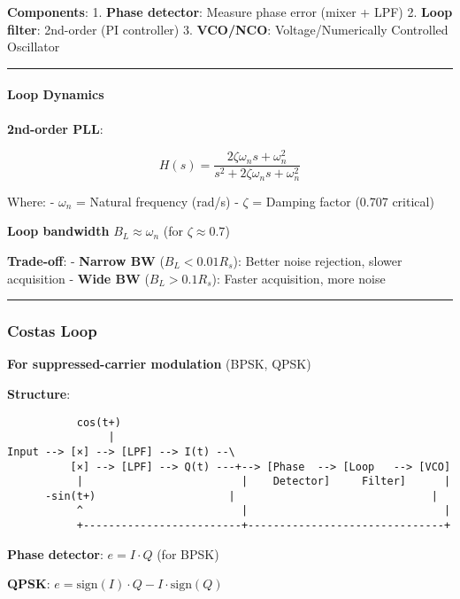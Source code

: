 \textbf{Components}: 1. \textbf{Phase detector}: Measure phase error
(mixer + LPF) 2. \textbf{Loop filter}: 2nd-order (PI controller) 3.
\textbf{VCO/NCO}: Voltage/Numerically Controlled Oscillator

\begin{center}\rule{0.5\linewidth}{0.5pt}\end{center}

\paragraph{Loop Dynamics}\label{loop-dynamics}

\textbf{2nd-order PLL}:

\[
H(s) = \frac{2\zeta\omega_n s + \omega_n^2}{s^2 + 2\zeta\omega_n s + \omega_n^2}
\]

Where: - \(\omega_n\) = Natural frequency (rad/s) - \(\zeta\) = Damping
factor (0.707 critical)

\textbf{Loop bandwidth} \(B_L \approx \omega_n\) (for
\(\zeta \approx 0.7\))

\textbf{Trade-off}: - \textbf{Narrow BW} (\(B_L < 0.01 R_s\)): Better
noise rejection, slower acquisition - \textbf{Wide BW}
(\(B_L > 0.1 R_s\)): Faster acquisition, more noise

\begin{center}\rule{0.5\linewidth}{0.5pt}\end{center}

\subsubsection{Costas Loop}\label{costas-loop}

\textbf{For suppressed-carrier modulation} (BPSK, QPSK)

\textbf{Structure}:

\begin{verbatim}
           cos(t+)
                |
Input --> [×] --> [LPF] --> I(t) --\
          [×] --> [LPF] --> Q(t) ---+--> [Phase  --> [Loop   --> [VCO]
           |                         |    Detector]     Filter]      |
      -sin(t+)                     |                               |
           ^                         |                               |
           +-------------------------+-------------------------------+
\end{verbatim}

\textbf{Phase detector}: \(e = I \cdot Q\) (for BPSK)

\textbf{QPSK}: \(e = \text{sign}(I) \cdot Q - I \cdot \text{sign}(Q)\)

